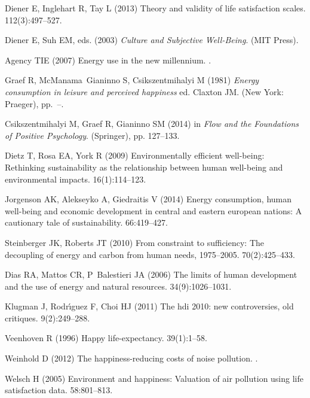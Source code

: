 \documentclass[10pt, letterpaper]{article}
\begin{document}
\begin{spacing}{1.4}
\begin{thebibliography}{10}
Diener E, Inglehart R, Tay L (2013) Theory and validity of life satisfaction
  scales.
 112(3):497--527.

Diener E, Suh EM, eds. (2003) {\em Culture and Subjective Well-Being}.
\newblock (MIT Press).

Agency TIE (2007) Energy use in the new millennium.
.

Graef R, McManama~Gianinno S, Csikszentmihalyi M (1981) {\em Energy consumption
  in leisure and perceived happiness} ed.{} Claxton JM.
\newblock (New York: Praeger), pp.~--.

Csikszentmihalyi M, Graef R, Gianinno SM (2014) in {\em Flow and the
  Foundations of Positive Psychology}.
\newblock (Springer), pp. 127--133.

Dietz T, Rosa EA, York R (2009) Environmentally efficient well-being:
  Rethinking sustainability as the relationship between human well-being and
  environmental impacts.
 16(1):114--123.

Jorgenson AK, Alekseyko A, Giedraitis V (2014) Energy consumption, human
  well-being and economic development in central and eastern european nations:
  A cautionary tale of sustainability.
 66:419--427.

Steinberger JK, Roberts JT (2010) From constraint to sufficiency: The
  decoupling of energy and carbon from human needs, 1975--2005.
 70(2):425--433.

Dias RA, Mattos CR, P~Balestieri JA (2006) The limits of human development and
  the use of energy and natural resources.
 34(9):1026--1031.

Klugman J, Rodr{\'\i}guez F, Choi HJ (2011) The hdi 2010: new controversies,
  old critiques.
 9(2):249--288.

Veenhoven R (1996) Happy life-expectancy.
 39(1):1--58.

Weinhold D (2012) The happiness-reducing costs of noise pollution.
.

Welsch H (2005) Environment and happiness: Valuation of air pollution using
  life satisfaction data.
 58:801--813.


\end{thebibliography}
\end{spacing}
\end{document}
